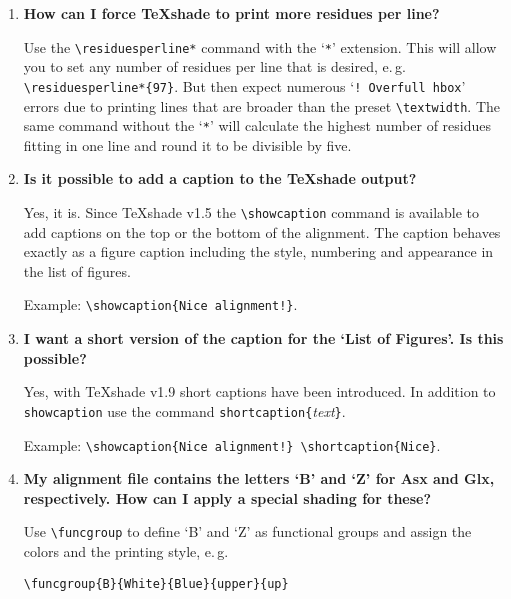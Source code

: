 \documentclass[12pt]{article}
\begin{document}
\begin{enumerate}

    \item
    
    \textbf{How can I force \TeX{}shade to print more residues per line?}
    
    Use the \verb|\residuesperline*| command with the `\verb|*|' extension. 
    This will allow you to set any number of residues per line that is 
    desired, e.\,g. \verb|\residuesperline*{97}|. But then expect numerous 
    `\texttt{!\ Overfull hbox}' errors due to printing lines that 
    are broader than the preset \verb|\textwidth|. The same command 
    without the `\verb|*|' will calculate the highest number of residues 
    fitting in one line and round it to be divisible by five.

    
    \item
    
    \textbf{Is it possible to add a caption to the \TeX{}shade output?}
    
    Yes, it is. Since \TeX{}shade v1.5 the \verb|\showcaption| 
    command is
    available to add captions on the top or the bottom of the
    alignment. The caption behaves exactly as a figure caption
    including the style, numbering and appearance in the list of 
    figures.
    \medskip
    
    Example: \verb|\showcaption{Nice alignment!}|.
    
    
    \item
    
    \textbf{I want a short version of the caption for the `List of 
    Figures'. Is this possible?}
    
    Yes, with \TeX{}shade v1.9 short captions have been introduced.
    In addition to \verb|showcaption| use the command 
    \verb|shortcaption{|\emph{text}\verb|}|.
    \medskip
    
    Example: \verb|\showcaption{Nice alignment!}|\ 
             \verb|\shortcaption{Nice}|.
    
    
    \item
    
    \textbf{My alignment file contains the letters `B' and `Z' for 
    Asx and Glx, respectively. How can I apply a special shading for 
    these?}
    
    Use \verb|\funcgroup| to define `B' and `Z' as functional groups 
    and assign the colors and the printing style, e.\,g.
    \medskip
    
    \verb|\funcgroup{B}{White}{Blue}{upper}{up}|
    \smallskip
    

\end{enumerate}
\end{document}
